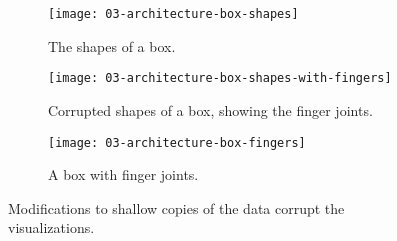 \documentclass[../../ClassicThesis.tex]{subfiles}
\begin{document}
\begin{figure}[h]
  \centering
  \begin{subfigure}[a]{0.3222\textwidth}
    \texttt{[image: 03-architecture-box-shapes]}
    \caption{The shapes of a box.}
    \label{fig:corrupt:shapes}
  \end{subfigure}
  \begin{subfigure}[b]{0.3222\textwidth}
    \texttt{[image: 03-architecture-box-shapes-with-fingers]}
    \caption{Corrupted shapes of a box, showing the finger joints.}
    \label{fig:corrupt:shapes-fingers}
  \end{subfigure}
  \begin{subfigure}[c]{0.3222\textwidth}
    \texttt{[image: 03-architecture-box-fingers]}
    \caption{A box with finger joints.}
    \label{fig:corrupt:fingers}
  \end{subfigure}
  \caption{Modifications to shallow copies of the data
    corrupt the visualizations.}
  \label{fig:corrupt}
\end{figure}




\end{document}
